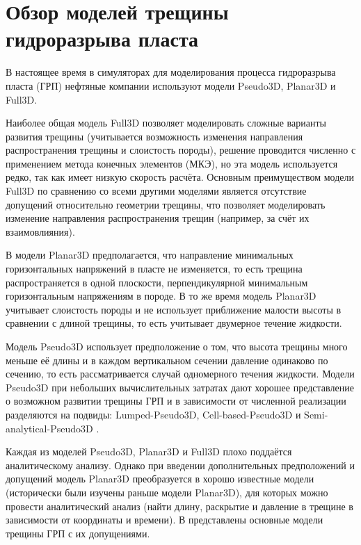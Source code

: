 \chapter{Обзор моделей трещины гидроразрыва пласта} \label{ch2}

В настоящее время в симуляторах для моделирования процесса гидроразрыва пласта (ГРП) нефтяные компании используют модели Pseudo3D, Planar3D и Full3D.

Наиболее общая модель Full3D позволяет моделировать сложные варианты развития трещины (учитывается возможность изменения направления распространения трещины и слоистость породы), решение проводится численно с применением метода конечных элементов (МКЭ), но эта модель используется редко, так как имеет низкую скорость расчёта.
Основным преимуществом модели Full3D по сравнению со всеми другими моделями является отсутствие допущений относительно геометрии трещины, что позволяет моделировать изменение направления распространения трещин (например, за счёт их взаимовлияния).

В модели Planar3D предполагается, что направление минимальных горизонтальных напряжений в пласте не изменяется, то есть трещина распространяется в одной плоскости, перпендикулярной минимальным горизонтальным напряжениям в породе.
В то же время модель Planar3D учитывает слоистость породы и не использует приближение малости высоты в сравнении с длиной трещины, то есть учитывает двумерное течение жидкости.

Модель Pseudo3D использует предположение о том, что высота трещины много меньше её длины и в каждом вертикальном сечении давление одинаково по сечению, то есть рассматривается случай одномерного течения жидкости.
Модели Pseudo3D при небольших вычислительных затратах дают хорошее представление о возможном развитии трещины ГРП и в зависимости от численной реализации разделяются на подвиды: Lumped-Pseudo3D, Cell-based-Pseudo3D \cite{adachi} и Semi-analytical-Pseudo3D \cite{shel_paderin}.

Каждая из моделей Pseudo3D, Planar3D и Full3D плохо поддаётся аналитическому анализу.
Однако при введении дополнительных предположений и допущений модель Planar3D преобразуется в хорошо известные модели (исторически были изучены раньше модели Planar3D), для которых можно провести аналитический анализ (найти длину, раскрытие и давление в трещине в зависимости от координаты и времени).
В  представлены основные модели трещины ГРП с их допущениями.

